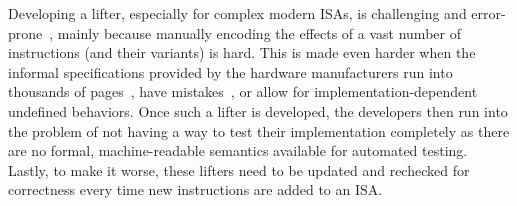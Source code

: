 
Developing a lifter, especially for complex modern ISAs, is
challenging and error-prone~\cite{Meng:2016}, mainly because manually encoding
the effects of a vast number of instructions (and their variants) is hard.
This is made even harder when the informal specifications provided by the hardware
manufacturers run into thousands of pages~\cite{IntelManual,ArmManual}, have
mistakes~\cite{DasguptaAdve:PLDI19}, 
or allow for implementation-dependent undefined behaviors. Once such
a lifter is developed, the developers then run into the problem of not having
a way to test their implementation completely as there are no formal,
machine-readable semantics available for automated testing. Lastly, to make it
worse, these lifters need to be updated and rechecked for correctness every
time new instructions are added to an ISA.


